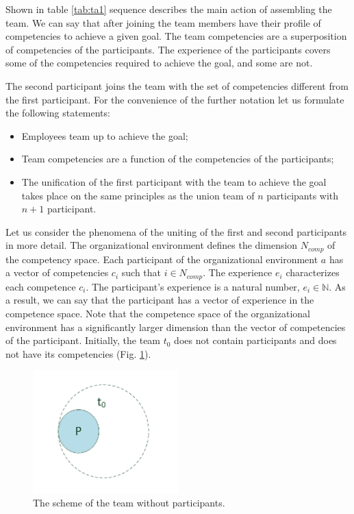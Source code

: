 \documentclass[12pt]{report}
\theoremstyle{definition}
\providecommand{\tightlist}{%
	\setlength{\itemsep}{0pt}\setlength{\parskip}{0pt}}
\begin{document}
Shown in table  \ref{tab:ta1} sequence describes the main action of assembling the team.
We can say that after joining the team members have their profile of competencies to achieve a given goal. 
The team competencies are a superposition of competencies of the participants. 
The experience of the participants covers some of the competencies required to achieve the goal, and some are not.

The second participant joins the team with the set of competencies different from the first participant. 
For the convenience of the further notation let us formulate the following statements:

\begin{itemize}
	\tightlist
	\item Employees team up to achieve the goal;
	\item Team competencies are a function of the competencies of the participants;
	\item The unification of the first participant with the team to achieve the goal takes place on the same principles as the union team of $n$ participants with $n+1$ participant.
\end{itemize}

Let us consider the phenomena of the uniting of the first and second participants in more detail. 
The organizational environment defines the dimension $N_{comp}$ of the competency space. 
Each participant of the organizational environment $a$ has a vector of competencies $c_i$ such that $i \in N_{comp}$. 
The experience  $e_i$ characterizes each competence  $c_i$. 
The participant's experience is a natural number, $e_i \in \mathbb{N}$. 
As a result, we can say that the participant has a vector of experience in the competence space. 
Note that the competence space of the organizational environment has a significantly larger dimension than the vector of competencies of the participant.
Initially, the team $t_0$  does not contain participants and does not have its competencies (Fig. \ref{fig:ta3}).

\begin{figure}[ht]
	\centering
	\includegraphics[width=0.5\textwidth]{scrum_fig3}
	\caption{The scheme of the team without participants.}
	\label{fig:ta3}		
\end{figure}
\end{document}
